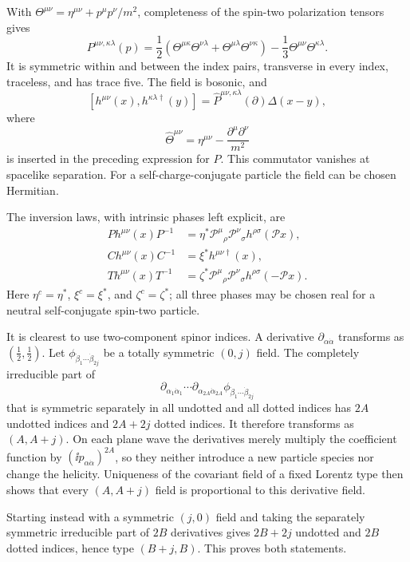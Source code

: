 \begin{enumerate}
With
\(\Theta^{\mu\nu}=\eta^{\mu\nu}+p^\mu p^\nu/m^2\), completeness of the
spin-two polarization tensors gives
\[
 P^{\mu\nu,\kappa\lambda}(p)=
 \frac12\left(
 \Theta^{\mu\kappa}\Theta^{\nu\lambda}
 +\Theta^{\mu\lambda}\Theta^{\nu\kappa}\right)
 -\frac13\Theta^{\mu\nu}\Theta^{\kappa\lambda}.
\]
It is symmetric within and between the index pairs, transverse in every
index, traceless, and has trace five.  The field is bosonic, and
\[
 [h^{\mu\nu}(x),h^{\kappa\lambda\dagger}(y)]
 =
 \widehat P^{\mu\nu,\kappa\lambda}(\partial)\Delta(x-y),
\]
where
\[
 \widehat\Theta^{\mu\nu}
 =\eta^{\mu\nu}-\frac{\partial^\mu\partial^\nu}{m^2}
\]
is inserted in the preceding expression for \(P\).  This commutator vanishes
at spacelike separation.  For a self-charge-conjugate particle the field can
be chosen Hermitian.

The inversion laws, with intrinsic phases left explicit, are
\[
\begin{split}
 Ph^{\mu\nu}(x)P^{-1}
 &=\eta^*\mathcal P^\mu{}_\rho\mathcal P^\nu{}_\sigma
 h^{\rho\sigma}(\mathcal P x),\\
 Ch^{\mu\nu}(x)C^{-1}
 &=\xi^*h^{\mu\nu\dagger}(x),\\
 Th^{\mu\nu}(x)T^{-1}
 &=\zeta^*\mathcal P^\mu{}_\rho\mathcal P^\nu{}_\sigma
 h^{\rho\sigma}(-\mathcal P x).
\end{split}
\]
Here \(\eta^c=\eta^*\), \(\xi^c=\xi^*\), and
\(\zeta^c=\zeta^*\); all three phases may be chosen real for a neutral
self-conjugate spin-two particle.

It is clearest to use two-component spinor indices.  A derivative
\(\partial_{\alpha\dot\alpha}\) transforms as
\((\tfrac12,\tfrac12)\).  Let
\(\phi_{\dot\beta_1\cdots\dot\beta_{2j}}\) be a totally symmetric
\((0,j)\) field.  The completely irreducible part of
\[
 \partial_{\alpha_1\dot\alpha_1}\cdots
 \partial_{\alpha_{2A}\dot\alpha_{2A}}
 \phi_{\dot\beta_1\cdots\dot\beta_{2j}}
\]
that is symmetric separately in all undotted and all dotted indices has
\(2A\) undotted indices and \(2A+2j\) dotted indices.  It therefore
transforms as \((A,A+j)\).  On each plane wave the derivatives merely
multiply the coefficient function by
\((\ii p_{\alpha\dot\alpha})^{2A}\), so they neither introduce a new particle
species nor change the helicity.  Uniqueness of the covariant field of a
fixed Lorentz type then shows that every \((A,A+j)\) field is proportional
to this derivative field.

Starting instead with a symmetric \((j,0)\) field and taking the separately
symmetric irreducible part of \(2B\) derivatives gives \(2B+2j\) undotted
and \(2B\) dotted indices, hence type \((B+j,B)\).  This proves both
statements.


\end{enumerate}
